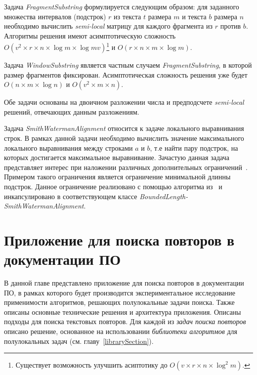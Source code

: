 Задача \emph{FragmentSubstring} формулируется следующим образом: для заданного множества интервалов (подстрок) $r$ из текста $t$ размера $m$ и текста $b$ размера $n$ необходимо вычислить \emph{semi-local} матрицу для каждого фрагмента из $r$ против $b$.
Алгоритмы решения имеют асимптотическую сложность $O(v^2 \times r \times  n \times \log m \times \log mv)$\footnote{Существует возможность улучшить асиптотику до $O(v \times r \times  n \times \log^{2} m)$.} и $O(r \times n \times m  \times \log m)$.

Задача \emph{WindowSubstring} является частным случаем  \emph{FragmentSubstring}, в которой размер фрагментов фиксирован.
Асимптотическая сложность решения уже будет $O(n \times m \times \log n)$ и $O(v^2 \times  m \times n)$.

Обе задачи основаны на двоичном разложении числа и предподсчете \emph{semi-local} решений, отвечающих данным разложениям.

Задача \emph{SmithWatermanAlignment} относится к задаче локального выравнивания строк.
В рамках данной задачи необходимо вычислить значение максимального локального выравнивания между строками $a$ и $b$, т.е найти пару подстрок, на которых достигается максимальное выравнивание.
Зачастую данная задача представляет интерес при наложении различных дополнительных ограничений~\cite{arslan2004dynamic}.
Примером такого ограничения является ограничение минимальной длинны подстрок.
Данное ограничение реализовано с помощью алгоритма из~\cite{tiskin2019bounded} и инкапсулировано в соответствующем классе \emph{BoundedLength-SmithWatermanAlignment}.




\section{Приложение для поиска повторов в документации ПО}\label{searchPO}
В данной главе представлено приложение для поиска повторов в документации ПО, в рамках которого будет производится экспериментальное исследование применимости алгоритмов, решающих полулокальные задачи поиска.
Также описаны основные технические решения и архитектура приложения.
Описаны подходы для поиска текстовых повторов.
Для каждой из \emph{задач поиска повторов} описано решение, основанное на использовании \emph{библиотеки алгоритмов} для полулокальных задач (см. главу~\ref{librarySection}).


